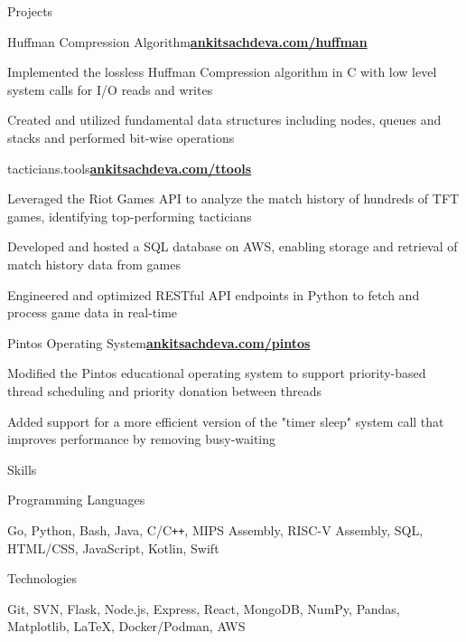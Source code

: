 \documentclass{resume}
\begin{document}
\begin{rSection}{\large Projects}

\begin{rSubsection}{Huffman Compression Algorithm}{\href{https://ankitsachdeva.com/huffman/}{\bf{{ankitsachdeva.com/huffman}}}}{}{}
\item Implemented the lossless Huffman Compression algorithm in C with low level system calls for I/O reads and writes
\item Created and utilized fundamental data structures including nodes, queues and stacks and performed bit-wise operations
\end{rSubsection}

\begin{rSubsection}{tacticians.tools}{\href{https://tacticians.tools/}{\bf{{ankitsachdeva.com/ttools}}}}{}{}
\item Leveraged the Riot Games API to analyze the match history of hundreds of TFT games, identifying top-performing tacticians
\item Developed and hosted a SQL database on AWS, enabling storage and retrieval of match history data from games
\item Engineered and optimized RESTful API endpoints in Python to fetch and process game data in real-time
\end{rSubsection}

\begin{rSubsection}{Pintos Operating System}{\href{http://ankitsachdeva.com/pintos/}{\bf{{ankitsachdeva.com/pintos}}}}{}{}
\item Modified the Pintos educational operating system to support priority-based thread scheduling and priority donation between threads
\item Added support for a more efficient version of the "timer sleep" system call that improves performance by removing busy-waiting
\end{rSubsection}

\end{rSection}

\begin{rSection}{\large Skills}

\begin{rSubsection}{Programming Languages}{}{}{}
\item Go, Python, Bash, Java, C/C{}\verb!++!, MIPS Assembly, RISC-V Assembly, SQL, HTML/CSS, JavaScript, Kotlin, Swift 
\end{rSubsection}

\begin{rSubsection}{Technologies}{}{}{}
\item Git, SVN, Flask, Node.js, Express, React, MongoDB, NumPy, Pandas, Matplotlib, LaTeX, Docker/Podman, AWS
\end{rSubsection}
\end{rSection}
\end{document}
